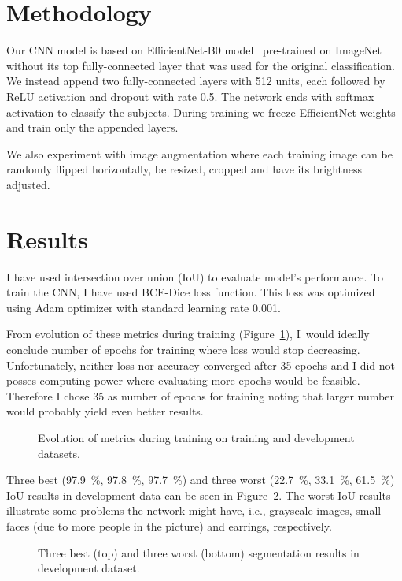 \documentclass[9pt]{IEEEtran}
\begin{document}
\section{Methodology}

Our CNN model is based on EfficientNet-B0 model~\cite{efficientNet} pre-trained on ImageNet~\cite{imageNet} without its top fully-connected layer that was used for the original classification.
We instead append two fully-connected layers with 512 units, each followed by ReLU activation and dropout with rate 0.5.
The network ends with softmax activation to classify the subjects.
During training we freeze EfficientNet weights and train only the appended layers.

We also experiment with image augmentation where each training image can be randomly flipped horizontally, be resized, cropped and have its brightness adjusted.

\section{Results}
I have used intersection over union (IoU) to evaluate model's performance.
To train the CNN, I have used BCE-Dice loss function.
This loss was optimized using Adam optimizer with standard learning rate 0.001.

From evolution of these metrics during training (Figure~\ref{fig:evo}), I~would ideally conclude number of epochs for training where loss would stop decreasing.
Unfortunately, neither loss nor accuracy converged after 35 epochs and I did not posses computing power where evaluating more epochs would be feasible.
Therefore I chose 35 as number of epochs for training noting that larger number would probably yield even better results.

\begin{figure}[ht]
    \centering
    \caption{Evolution of metrics during training on training and development datasets.}
    \label{fig:evo}
\end{figure}

Three best (97.9~\%, 97.8~\%, 97.7~\%) and three worst (22.7~\%, 33.1~\%, 61.5~\%) IoU results in development data can be seen in Figure~\ref{fig:examples}.
The worst IoU results illustrate some problems the network might have, i.e., grayscale images, small faces (due to more people in the picture) and earrings, respectively.

\begin{figure}[H]
    \centering
    \vspace{0.5cm}
    \caption{Three best (top) and three worst (bottom) segmentation results in development dataset.}
    \label{fig:examples}
\end{figure}
\end{document}
